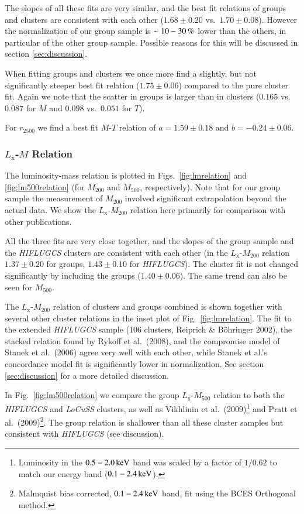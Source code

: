 \documentclass[structabstract]{aa}
\begin{document}
 The slopes of all these fits are very similar, and the best fit
 relations of groups and clusters are consistent with each other
 ($1.68\pm0.20$ vs.\ $1.70\pm0.08$). However the normalization of our
 group sample is $\unit[\sim10-30]{\%}$ lower than the others, in
 particular of the other group sample. Possible reasons for this will
 be discussed in section \ref{sec:discussion}.

 When fitting groups and clusters we once more find a slightly,
   but not significantly steeper best fit relation ($1.75\pm0.06$)
   compared to the pure cluster fit. Again we note that the scatter
 in groups is larger than in clusters ($0.165$ vs.\ $0.087$ for
   $M$ and $0.098$ vs.\ $0.051$ for $T$).

 For $r_{2500}$ we find a best fit $M$-$T$ relation of
   $a=1.59\pm0.18$ and $b=-0.24\pm0.06$.
%
 \subsubsection{$L_{\text{x}}$-$M$ Relation}
 The luminosity-mass relation is plotted in Figs.\
 \ref{fig:lmrelation} and \ref{fig:lm500relation} (for $M_{200}$ and
 $M_{500}$, respectively). Note that for our group sample the
 measurement of $M_{200}$ involved significant extrapolation beyond
 the actual data. We show the $L_{\text{x}}$-$M_{200}$ relation here
 primarily for comparison with other publications.
  
 All the three fits are very close together, and the slopes of the
   group sample and the \emph{HIFLUGCS} clusters are consistent with
   each other (in the $L_{\text{x}}$-$M_{200}$ relation $1.37 \pm
   0.20$ for groups, $1.43 \pm 0.10$ for \emph{HIFLUGCS}). The
 cluster fit is not changed significantly by including the groups
 ($1.40 \pm 0.06$). The same trend can also be seen for $M_{500}$.
 
 The $L_{\text{x}}$-$M_{200}$ relation of clusters and groups
 combined is shown together with several other cluster relations in
 the inset plot of Fig.\ \ref{fig:lmrelation}. The fit to the extended
 \emph{HIFLUGCS} sample (106 clusters, Reiprich \& B\"ohringer 2002),
 the stacked relation found by Rykoff et al.\ (2008), and the
 compromise model of Stanek et al.\ (2006) agree very well with each
 other, while Stanek et al.'s concordance model fit is significantly
 lower in normalization. See section \ref{sec:discussion} for a more
 detailed discussion.

In Fig.\ \ref{fig:lm500relation} we compare the group
$L_{\text{x}}$-$M_{500}$ relation to both the \emph{HIFLUGCS} and
\emph{LoCuSS} clusters, as well as Vikhlinin et al.\
(2009)\footnote{Luminosity in the $\unit[0.5-2.0]{keV}$ band was
  scaled by a factor of $1/0.62$ to match our energy band
  ($\unit[0.1-2.4]{keV}$).} and Pratt et al.\
(2009)\footnote{Malmquist bias corrected, $\unit[0.1-2.4]{keV}$ band,
  fit using the BCES Orthogonal method.}. The group relation is
shallower than all these cluster samples but consistent with
\emph{HIFLUGCS} (see discussion).
\end{document}
